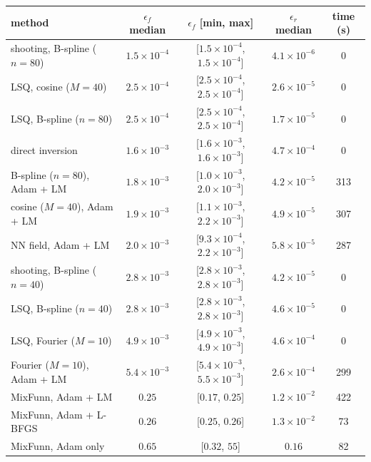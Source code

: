 \begin{tabular}{lcccc}
\toprule
method & $\epsilon_f$ median & $\epsilon_f$ [min, max] & $\epsilon_r$ median & time (s) \\
\midrule
shooting, B-spline ($n{=}80$) & $1.5\times10^{-4}$ & [$1.5\times10^{-4}$, $1.5\times10^{-4}$] & $4.1\times10^{-6}$ & 0 \\
LSQ, cosine ($M{=}40$) & $2.5\times10^{-4}$ & [$2.5\times10^{-4}$, $2.5\times10^{-4}$] & $2.6\times10^{-5}$ & 0 \\
LSQ, B-spline ($n{=}80$) & $2.5\times10^{-4}$ & [$2.5\times10^{-4}$, $2.5\times10^{-4}$] & $1.7\times10^{-5}$ & 0 \\
direct inversion & $1.6\times10^{-3}$ & [$1.6\times10^{-3}$, $1.6\times10^{-3}$] & $4.7\times10^{-4}$ & 0 \\
B-spline ($n{=}80$), Adam + LM & $1.8\times10^{-3}$ & [$1.0\times10^{-3}$, $2.0\times10^{-3}$] & $4.2\times10^{-5}$ & 313 \\
cosine ($M{=}40$), Adam + LM & $1.9\times10^{-3}$ & [$1.1\times10^{-3}$, $2.2\times10^{-3}$] & $4.9\times10^{-5}$ & 307 \\
NN field, Adam + LM & $2.0\times10^{-3}$ & [$9.3\times10^{-4}$, $2.2\times10^{-3}$] & $5.8\times10^{-5}$ & 287 \\
shooting, B-spline ($n{=}40$) & $2.8\times10^{-3}$ & [$2.8\times10^{-3}$, $2.8\times10^{-3}$] & $4.2\times10^{-5}$ & 0 \\
LSQ, B-spline ($n{=}40$) & $2.8\times10^{-3}$ & [$2.8\times10^{-3}$, $2.8\times10^{-3}$] & $4.6\times10^{-5}$ & 0 \\
LSQ, Fourier ($M{=}10$) & $4.9\times10^{-3}$ & [$4.9\times10^{-3}$, $4.9\times10^{-3}$] & $4.6\times10^{-4}$ & 0 \\
Fourier ($M{=}10$), Adam + LM & $5.4\times10^{-3}$ & [$5.4\times10^{-3}$, $5.5\times10^{-3}$] & $2.6\times10^{-4}$ & 299 \\
MixFunn, Adam + LM & $0.25$ & [$0.17$, $0.25$] & $1.2\times10^{-2}$ & 422 \\
MixFunn, Adam + L-BFGS & $0.26$ & [$0.25$, $0.26$] & $1.3\times10^{-2}$ & 73 \\
MixFunn, Adam only & $0.65$ & [$0.32$, $55$] & $0.16$ & 82 \\
\bottomrule
\end{tabular}
